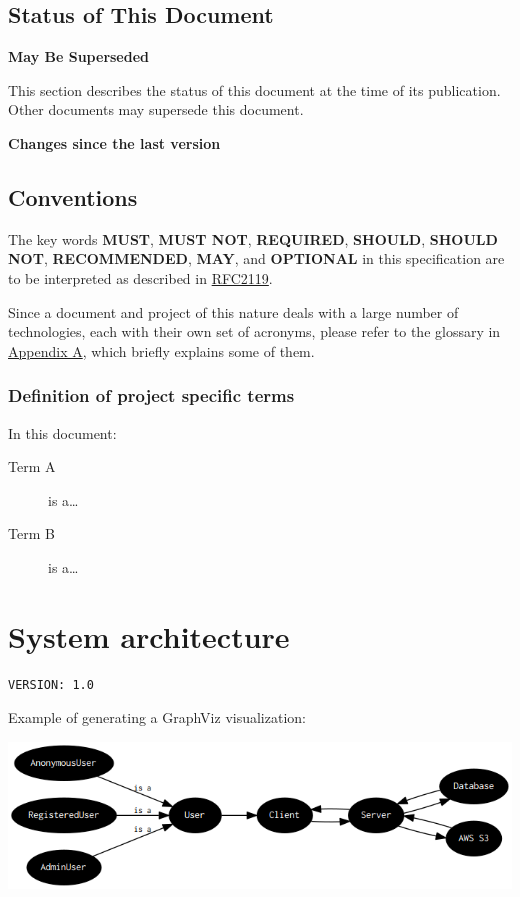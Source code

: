 \documentclass[letterpaper, 9pt, onecolumn, twoside, technote, final]{IEEEtran}
\begin{document}
\subsection{Status of This Document}
\label{sec:orgdb57c2a}

\textbf{May Be Superseded}

This section describes the status of this document at the time of its
publication. Other documents may supersede this document.

\textbf{Changes since the last version}

\subsection{Conventions}
\label{sec:orgb17798b}

The key words \textbf{MUST}, \textbf{MUST NOT}, \textbf{REQUIRED}, \textbf{SHOULD}, \textbf{SHOULD NOT},
\textbf{RECOMMENDED}, \textbf{MAY}, and \textbf{OPTIONAL} in this specification are to be
interpreted as described in \href{https://tools.ietf.org/html/2119}{RFC2119}.

Since a document and project of this nature deals with a large number
of technologies, each with their own set of acronyms, please refer to
the glossary in \hyperref[sec:org101d683]{Appendix A}, which briefly explains some of them.

\subsubsection{Definition of project specific terms}
\label{sec:orge08f817}

In this document:

\begin{description}
\item[{Term A}] is a\ldots{}
\item[{Term B}] is a\ldots{}
\end{description}
\section{System architecture}
\label{sec:org5a7642a}
\begin{verbatim}
VERSION: 1.0
\end{verbatim}

Example of generating a GraphViz visualization:

\begin{center}
\includegraphics[width=.9\linewidth]{assets/graph.png}
\end{center}
\end{document}
